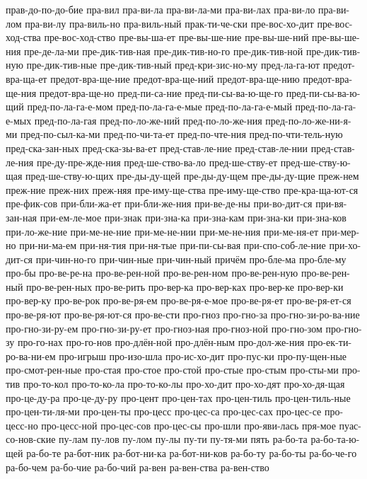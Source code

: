 {прав-до-по-до-бие
пра-вил
пра-ви-ла
пра-ви-ла-ми
пра-ви-лах
пра-ви-ло
пра-ви-лом
пра-ви-лу
пра-виль-но
пра-виль-ный
прак-ти-че-ски
пре-вос-хо-дит
пре-вос-ход-ства
пре-вос-ход-ство
пре-вы-ша-ет
пре-вы-ше-ние
пре-вы-ше-ний
пре-вы-ше-ния
пре-де-ла-ми
пре-дик-тив-ная
пре-дик-тив-но-го
пре-дик-тив-ной
пре-дик-тив-ную
пре-дик-тив-ные
пре-дик-тив-ный
пред-кри-зис-но-му
пред-ла-га-ют
предот-вра-ща-ет
предот-вра-ще-ние
предот-вра-ще-ний
предот-вра-ще-нию
предот-вра-ще-ния
предот-вра-ще-но
пред-пи-са-ние
пред-пи-сы-ва-ю-ще-го
пред-пи-сы-ва-ю-щий
пред-по-ла-га-е-мом
пред-по-ла-га-е-мые
пред-по-ла-га-е-мый
пред-по-ла-га-е-мых
пред-по-ла-гая
пред-по-ло-же-ний
пред-по-ло-же-ния
пред-по-ло-же-ни-я-ми
пред-по-сыл-ка-ми
пред-по-чи-та-ет
пред-по-чте-ния
пред-по-чти-тель-ную
пред-ска-зан-ных
пред-ска-зы-ва-ет
пред-став-ле-ние
пред-став-ле-нии
пред-став-ле-ния
пре-ду-пре-жде-ния
пред-ше-ство-ва-ло
пред-ше-ству-ет
пред-ше-ству-ю-щая
пред-ше-ству-ю-щих
пре-ды-ду-щей
пре-ды-ду-щем
пре-ды-ду-щие
преж-нем
преж-ние
преж-них
преж-няя
пре-иму-ще-ства
пре-иму-ще-ство
пре-кра-ща-ют-ся
пре-фик-сов
при-бли-жа-ет
при-бли-же-ния
при-ве-де-ны
при-во-дит-ся
при-вя-зан-ная
при-ем-ле-мое
при-знак
при-зна-ка
при-зна-кам
при-зна-ки
при-зна-ков
при-ло-же-ние
при-ме-не-ние
при-ме-не-нии
при-ме-не-ния
при-ме-ня-ет
при-мер-но
при-ни-ма-ем
при-ня-тия
при-ня-тые
при-пи-сы-вая
при-спо-соб-ле-ние
при-хо-дит-ся
при-чин-но-го
при-чин-ные
при-чин-ный
причём
про-бле-ма
про-бле-му
про-бы
про-ве-ре-на
про-ве-рен-ной
про-ве-рен-ном
про-ве-рен-ную
про-ве-рен-ный
про-ве-рен-ных
про-ве-рить
про-вер-ка
про-вер-ках
про-вер-ке
про-вер-ки
про-вер-ку
про-ве-рок
про-ве-ря-ем
про-ве-ря-е-мое
про-ве-ря-ет
про-ве-ря-ет-ся
про-ве-ря-ют
про-ве-ря-ют-ся
про-ве-сти
про-гноз
про-гно-за
про-гно-зи-ро-ва-ние
про-гно-зи-ру-ем
про-гно-зи-ру-ет
про-гноз-ная
про-гноз-ной
про-гно-зом
про-гно-зу
про-го-нах
про-го-нов
про-длён-ной
про-длён-ным
про-дол-же-ния
про-ек-ти-ро-ва-ни-ем
про-игрыш
про-изо-шла
про-ис-хо-дит
про-пус-ки
про-пу-щен-ные
про-смот-рен-ные
про-стая
про-стое
про-стой
про-стые
про-стым
про-сты-ми
про-тив
про-то-кол
про-то-ко-ла
про-то-ко-лы
про-хо-дит
про-хо-дят
про-хо-дя-щая
про-це-ду-ра
про-це-ду-ру
про-цент
про-цен-тах
про-цен-тиль
про-цен-тиль-ные
про-цен-ти-ля-ми
про-цен-ты
про-цесс
про-цес-са
про-цес-сах
про-цес-се
про-цесс-но
про-цесс-ной
про-цес-сов
про-цес-сы
про-шли
про-яви-лась
пря-мое
пуас-со-нов-ские
пу-лам
пу-лов
пу-лом
пу-лы
пу-ти
пу-тя-ми
пять
ра-бо-та
ра-бо-та-ю-щей
ра-бо-те
ра-бот-ник
ра-бот-ни-ка
ра-бот-ни-ков
ра-бо-ту
ра-бо-ты
ра-бо-че-го
ра-бо-чем
ра-бо-чие
ра-бо-чий
ра-вен
ра-вен-ства
ра-вен-ство
}
